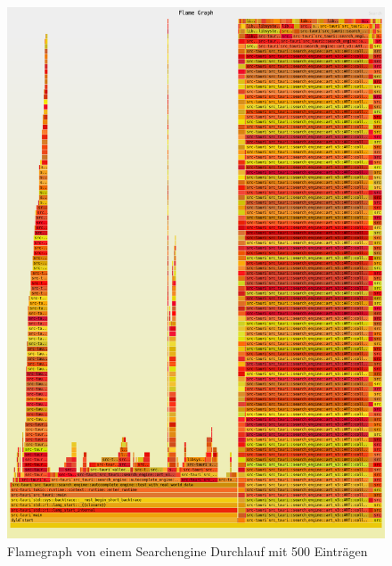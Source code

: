 \begin{figure}[htbp]
  \centering
  \includegraphics[width=1.0\textwidth]{./flamegraphs/test_with_real_world_data_500.png}
  \caption{Flamegraph von einem Searchengine Durchlauf mit 500 Einträgen}
  \label{fig:first_flame_graph}
\end{figure}

